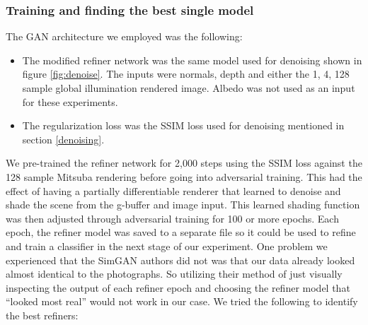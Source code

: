\documentclass[10pt,twocolumn,letterpaper]{article}
\begin{document}
\subsubsection{Training and finding the best single model} \label{sec:gans}
The GAN architecture we employed was the following:
\begin{itemize}
\item The modified refiner network was the same model used for denoising shown in figure \ref{fig:denoise}.  The inputs were normals, depth and either the 1, 4, 128 sample global illumination rendered image. Albedo was not used as an input for these experiments.
\item The regularization loss was the SSIM loss used for denoising mentioned in section \ref{denoising}.
\end{itemize}
We pre-trained the refiner network for 2,000 steps using the SSIM loss against the 128 sample Mitsuba rendering before going into adversarial training.  This had the effect of having a partially differentiable renderer that learned to denoise and shade the scene from the g-buffer and image input.  This learned shading function was then adjusted through adversarial training for 100 or more epochs.  Each epoch, the refiner model was saved to a separate file so it could be used to refine and train a classifier in the next stage of our experiment.  One problem we experienced that the SimGAN authors did not was that our data already looked almost identical to the photographs. So utilizing their method of just visually inspecting the output of each refiner epoch and choosing the refiner model that ``looked most real'' would not work in our case. We tried the following to identify the best refiners:
\end{document}
